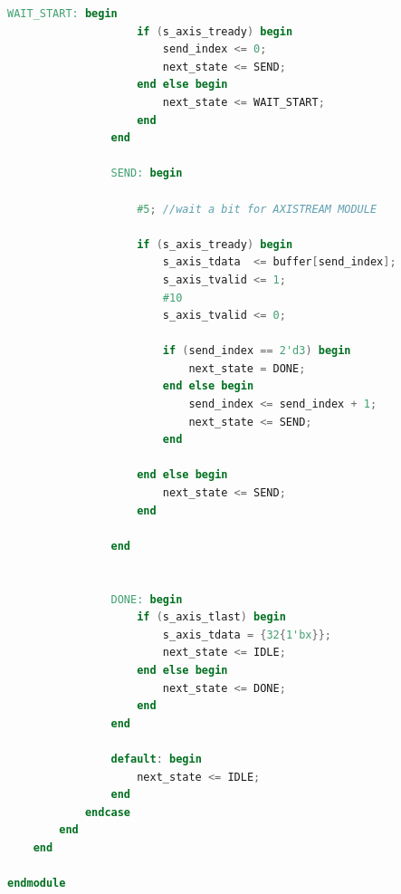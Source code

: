 \begin{lstlisting}[language=verilog,frame=single,caption={Código fuente de la cola FIFO conversora a AXI-Stream},showstringspaces=false,label=lst:legacyFifo2axis]
                WAIT_START: begin
                    if (s_axis_tready) begin
                        send_index <= 0;
                        next_state <= SEND;
                    end else begin
                        next_state <= WAIT_START;
                    end
                end
                
                SEND: begin
                    
                    #5; //wait a bit for AXISTREAM MODULE
                    
                    if (s_axis_tready) begin
                        s_axis_tdata  <= buffer[send_index];
                        s_axis_tvalid <= 1;
                        #10
                        s_axis_tvalid <= 0;
                        
                        if (send_index == 2'd3) begin
                            next_state = DONE;
                        end else begin
                            send_index <= send_index + 1;
                            next_state <= SEND;
                        end

                    end else begin
                        next_state <= SEND;
                    end

                end
                
                
                DONE: begin
                    if (s_axis_tlast) begin
                        s_axis_tdata = {32{1'bx}};
                        next_state <= IDLE;
                    end else begin
                        next_state <= DONE;
                    end
                end
                
                default: begin
                    next_state <= IDLE;
                end
            endcase
        end
    end

endmodule
\end{lstlisting}

